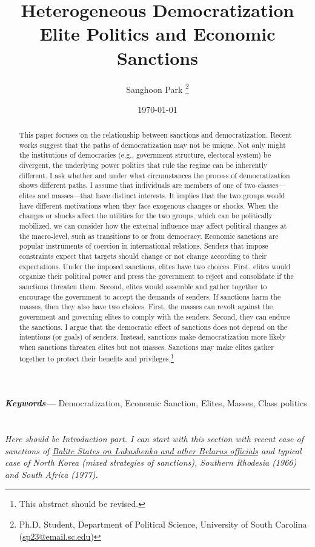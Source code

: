 \documentclass[11pt, letterpage]{article}
\title{\bf Heterogeneous Democratization\\
\Large Elite Politics and Economic Sanctions}
\author{Sanghoon Park
	\thanks{\small Ph.D. Student, Department of Political Science, University of South Carolina\\
		\hspace*{1.8em}(\href{sp23@email.sc.edu}{sp23@email.sc.edu})}}
\date{\today}
\providecommand{\keywords}[1]
{
	\small	
	\hspace*{10mm}\textbf{\textit{Keywords---}} #1
}
\begin{document}
	\maketitle

\begin{abstract}
	\onehalfspacing
	\noindent This paper focuses on the relationship between sanctions and democratization. Recent works suggest that the paths of democratization may not be unique. Not only might the institutions of democracies (e.g., government structure, electoral system) be divergent, the underlying power politics that rule the regime can be inherently different. I ask whether and under what circumstances the process of democratization shows different paths. I assume that individuals are members of one of two classes---elites and masses---that have distinct interests. It implies that the two groups would have different motivations when they face exogenous changes or shocks. When the changes or shocks affect the utilities for the two groups, which can be politically mobilized, we can consider how the external influence may affect political changes at the macro-level, such as transitions to or from democracy. Economic sanctions are popular instruments of coercion in international relations. Senders that impose constraints expect that targets should change or not change according to their expectations. Under the imposed sanctions, elites have two choices. First, elites would organize their political power and press the government to reject and consolidate if the sanctions threaten them. Second, elites would assemble and gather together to encourage the government to accept the demands of senders. If sanctions harm the masses, then they also have two choices. First, the masses can revolt against the government and governing elites to comply with the senders. Second, they can endure the sanctions. I argue that the democratic effect of sanctions does not depend on the intentions (or goals) of senders. Instead, sanctions make democratization more likely when sanctions threaten elites but not masses. Sanctions may make elites gather together to protect their benefits and privileges.\footnote{This abstract should be revised.}
\end{abstract}
\keywords{Democratization, Economic Sanction, Elites, Masses, Class politics}
\newpage
\section*{}
\textit{Here should be Introduction part. I can start with this section with recent case of sanctions of \href{https://www.reuters.com/article/us-belarus-election-sanctions/baltic-states-to-hit-lukashenko-other-belarus-officials-with-sanctions-idUSKBN25R0Z7}{Balitc States on Lukashenko and other Belarus officials} and typical case of North Korea (mixed strategies of sanctions), Southern Rhodesia (1966) and South Africa (1977).} 
\end{document}
